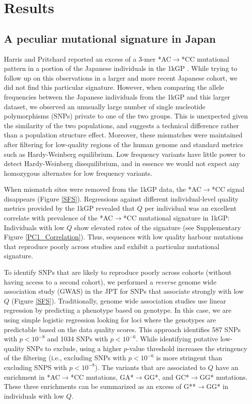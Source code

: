\documentclass[9pt,lineno]{elife}
\begin{document}
			\section{Results}
			
	\subsection{A peculiar mutational signature in Japan}			
	
Harris and Pritchard reported an excess of a 3-mer *AC${\rightarrow}$*CC mutational pattern in a portion of the Japanese individuals in the 1kGP \citep{Harris2015a}.
While trying to follow up on this observations in a larger and more recent Japanese cohort, we did not find this particular signature.
However, when comparing the allele frequencies between the Japanese individuals from the 1kGP and this larger dataset, we observed an unusually large number of single nucleotide polymorphisms (SNPs) private to one of the two groups.
This is unexpected given the similarity of the two populations, and suggests a technical difference rather than a population structure effect. 
Moreover, these mismatches were maintained after filtering for low-quality regions of the human genome and standard metrics such as Hardy-Weinberg equilibrium.
Low frequency variants have little power to detect Hardy-Weinberg disequilibrium, and in essence we would not expect any homozygous alternates for low frequency variants. 

When mismatch sites were removed from the 1kGP data, the  *AC${\rightarrow}$*CC signal disappears (Figure \ref{SFS}).
Regressions against different individual-level quality metrics provided by the 1kGP revealed that $Q$ per individual was an excellent correlate with prevalence of the  *AC${\rightarrow}$*CC mutational signature in 1kGP:
Individuals with low $Q$ show elevated rates of the signature (see Supplementary Figure \ref{PC1_Correlation}).
Thus, sequences with low quality harbour mutations that reproduce poorly across studies and exhibit a particular mutational signature. 

To identify SNPs that are likely to reproduce poorly across cohorts (without having access to a second cohort), we performed a \textit{reverse} genome wide association study (GWAS) in the JPT for SNPs that associate strongly with low $Q$ (Figure \ref{SFS}).
Traditionally, genome wide association studies use linear regression by predicting a phenotype based on genotype. 
In this case, we are using simple logistic regression looking for loci where the genotypes are predictable based on the data quality scores.
This approach identifies 587 SNPs with $p < 10^{-8}$ and 1034 SNPs with $ p < 10^{-6}$.
While identifying putative low-quality SNPs to exclude, using a higher $p$-value threshold increases the stringency of the filtering (i.e., excluding SNPs with $ p < 10^{-6}$ is more stringent than excluding SNPS with $p < 10^{-8}$). 
The variants that are associated to $Q$ have an enrichment in *AC${\rightarrow}$*CC mutations, GA*${\rightarrow}$GG*, and GC*${\rightarrow}$GG* mutations.
These three enrichments can be summarized as an excess of G**${\rightarrow}$GG* in individuals with low $Q$.
\end{document}
